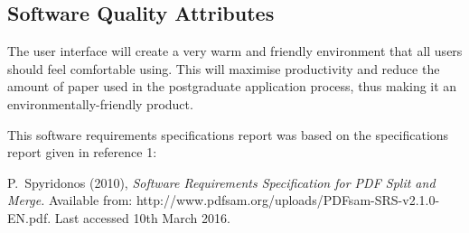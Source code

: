 \documentclass[journal,comsoc,onecolumn]{IEEEtran}
\begin{document}
\subsection{Software Quality Attributes}
The user interface will create a very warm and friendly environment that all users should feel comfortable using. This will maximise productivity and reduce the amount of paper used in the postgraduate application process, thus making it an environmentally-friendly product.

\pagebreak


This software requirements specifications report was based on the specifications report given in reference 1:

\begin{thebibliography}{1}

P.~Spyridonos (2010), \emph{Software Requirements Specification for PDF Split and Merge.} Available from: http://www.pdfsam.org/uploads/PDFsam-SRS-v2.1.0-EN.pdf. Last accessed 10th March 2016.

\end{thebibliography}

\end{document}
